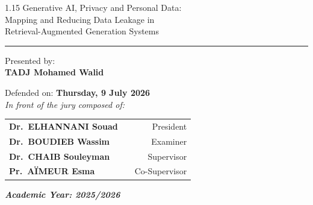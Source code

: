 \documentclass[12pt,a4paper]{article}
\begin{document}
\begin{center}
\vspace{0.2cm}
{\LARGE\bfseries\begin{spacing}{1.15}
Generative AI, Privacy and Personal Data:\\
Mapping and Reducing Data Leakage in\\
Retrieval-Augmented Generation Systems
\end{spacing}}
\vspace{0.2cm}

\rule{\titlerulew}{0.6pt}

\vspace{0.2cm}

{\large
Presented by:\\[2pt]
{\textbf{TADJ Mohamed Walid}}

\vspace{0.2cm}

Defended on: \textbf{Thursday, 9 July 2026}\\[2pt]
{\itshape In front of the jury composed of:}
}

\end{center}

\vspace{0.15cm}

\noindent
{\large
\begin{tabularx}{\textwidth}{@{}l X r@{}}
\textbf{Dr.~ELHANNANI Souad} & & President  \\[2pt]
\textbf{Dr.~BOUDIEB Wassim}  & & Examiner   \\[2pt]
\textbf{Dr.~CHAIB Souleyman} & & Supervisor \\[2pt]
\textbf{Pr.~AÏMEUR Esma}     & & Co-Supervisor \\
\end{tabularx}}

\vfill

\begin{center}
{\bfseries\itshape Academic Year: 2025/2026}
\end{center}
\end{document}

